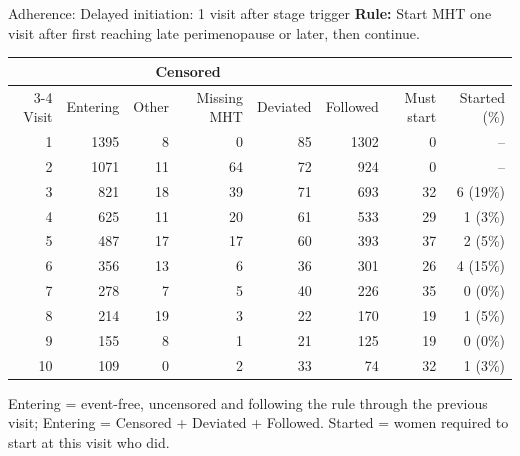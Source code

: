 \documentclass[aspectratio=169]{beamer}
\begin{document}
\begin{frame}{Adherence: Delayed initiation: 1 visit after stage trigger}
\centering
{\small \textbf{Rule:} Start MHT one visit after first reaching late perimenopause or later, then continue.}\par\vspace{6pt}
{\scriptsize
\begin{tabular}{r r r r r r r r}
\toprule
 & & \multicolumn{2}{c}{Censored} & & & & \\
\cmidrule(lr){3-4}
Visit & Entering & Other & Missing MHT & Deviated & Followed & Must start & Started (\%) \\
\midrule
1 & 1395 & 8 & 0 & 85 & 1302 & 0 & -- \\
2 & 1071 & 11 & 64 & 72 & 924 & 0 & -- \\
3 & 821 & 18 & 39 & 71 & 693 & 32 & 6 (19\%) \\
4 & 625 & 11 & 20 & 61 & 533 & 29 & 1 (3\%) \\
5 & 487 & 17 & 17 & 60 & 393 & 37 & 2 (5\%) \\
6 & 356 & 13 & 6 & 36 & 301 & 26 & 4 (15\%) \\
7 & 278 & 7 & 5 & 40 & 226 & 35 & 0 (0\%) \\
8 & 214 & 19 & 3 & 22 & 170 & 19 & 1 (5\%) \\
9 & 155 & 8 & 1 & 21 & 125 & 19 & 0 (0\%) \\
10 & 109 & 0 & 2 & 33 & 74 & 32 & 1 (3\%) \\
\bottomrule
\end{tabular}}
\par\vspace{6pt}
{\tiny Entering = event-free, uncensored and following the rule through the previous visit; Entering = Censored + Deviated + Followed. Started = women required to start at this visit who did.}
\end{frame}
\end{document}
